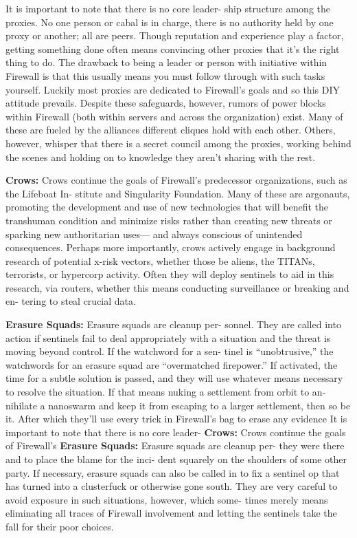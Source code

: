It is important to note that there is no core leader-
ship structure among the proxies. No one person or 
cabal is in charge, there is no authority held by one 
proxy or another; all are peers. Though reputation 
and experience play a factor, getting something done 
often means convincing other proxies that it's the 
right thing to do. The drawback to being a leader 
or person with initiative within Firewall is that this 
usually means you must follow through with such 
tasks yourself. Luckily most proxies are dedicated 
to Firewall's goals and so this DIY attitude prevails. 
Despite these safeguards, however, rumors of power 
blocks within Firewall (both within servers and 
across the organization) exist. Many of these are 
fueled by the alliances different cliques hold with 
each other. Others, however, whisper that there is 
a secret council among the proxies, working behind 
the scenes and holding on to knowledge they aren't 
sharing with the rest.

\textbf{Crows:} Crows continue the goals of Firewall's 
predecessor organizations, such as the Lifeboat In-
stitute and Singularity Foundation. Many of these 
are argonauts, promoting the development and use 
of new technologies that will benefit the transhuman 
condition and minimize risks rather than creating 
new threats or sparking new authoritarian uses—
and always conscious of unintended consequences. 
Perhaps more importantly, crows actively engage 
in background research of potential x-risk vectors, 
whether those be aliens, the TITANs, terrorists, or 
hypercorp activity. Often they will deploy sentinels 
to aid in this research, via routers, whether this 
means conducting surveillance or breaking and en-
tering to steal crucial data. 

\textbf{Erasure Squads:} Erasure squads are cleanup per-
sonnel. They are called into action if sentinels fail to 
deal appropriately with a situation and the threat is 
moving beyond control. If the watchword for a sen-
tinel is ``unobtrusive,'' the watchwords for an erasure 
squad are ``overmatched firepower.'' If activated, the 
time for a subtle solution is passed, and they will use 
whatever means necessary to resolve the situation. 
If that means nuking a settlement from orbit to an-
nihilate a nanoswarm and keep it from escaping to 
a larger settlement, then so be it. After which they'll 
use every trick in Firewall's bag to erase any evidence 
It is important to note that there is no core leader-
\textbf{Crows:} Crows continue the goals of Firewall's 
\textbf{Erasure Squads:} Erasure squads are cleanup per-
they were there and to place the blame for the inci-
dent squarely on the shoulders of some other party. 
If necessary, erasure squads can also be called in to 
fix a sentinel op that has turned into a clusterfuck or 
otherwise gone south. They are very careful to avoid 
exposure in such situations, however, which some-
times merely means eliminating all traces of Firewall 
involvement and letting the sentinels take the fall for 
their poor choices.

